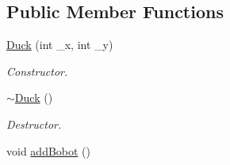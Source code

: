 \subsection*{Public Member Functions}
\begin{DoxyCompactItemize}
\item 
\hyperlink{classDuck_a1322bd1a93555cd105e2496ba2de2a30}{Duck} (int \-\_\-x, int \-\_\-y)
\begin{DoxyCompactList}\small\item\em Constructor. \end{DoxyCompactList}\item 
\hypertarget{classDuck_a702222da0aa85e48b6ef945e9c53e68d}{\hyperlink{classDuck_a702222da0aa85e48b6ef945e9c53e68d}{$\sim$\-Duck} ()}\label{classDuck_a702222da0aa85e48b6ef945e9c53e68d}

\begin{DoxyCompactList}\small\item\em Destructor. \end{DoxyCompactList}\item 
\hypertarget{classDuck_ad0f24d52e0643275dfa7ab85838a174f}{void \hyperlink{classDuck_ad0f24d52e0643275dfa7ab85838a174f}{add\-Bobot} ()}\label{classDuck_ad0f24d52e0643275dfa7ab85838a174f}


\end{DoxyCompactItemize}
